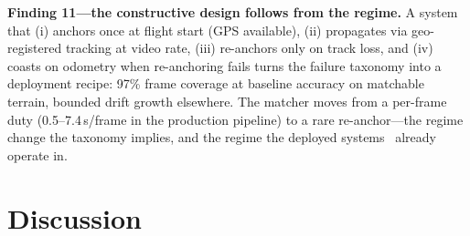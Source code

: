 \documentclass[journal]{IEEEtran}
\begin{document}
\textbf{Finding 11---the constructive design follows from the regime.} A system that (i) anchors once at flight start (GPS available), (ii) propagates via geo-registered tracking at video rate, (iii) re-anchors only on track loss, and (iv) coasts on odometry when re-anchoring fails turns the failure taxonomy into a deployment recipe: 97\% frame coverage at baseline accuracy on matchable terrain, bounded drift growth elsewhere. The matcher moves from a per-frame duty (0.5--7.4\,s/frame in the production pipeline) to a rare re-anchor---the regime change the taxonomy implies, and the regime the deployed systems~\cite{orthotrack,naviloc,cpfl} already operate in.

\section{Discussion}
\end{document}
